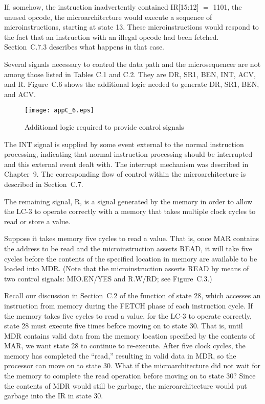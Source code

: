\documentclass{patt}
\begin{document}
If, somehow, the instruction inadvertently contained IR[15:12] $=$
1101, the unused opcode, the \nobreak microarchitecture would execute a
sequence of \nobreak microinstructions, starting at state 13.  These
microinstructions would respond to the fact that an instruction with
an illegal opcode had been fetched.  Section~C.7.3 describes what
happens in that case.

Several signals necessary to control the data path and the
microsequencer are not among those listed in Tables C.1 and C.2.  They
are DR, SR1, BEN, INT, ACV, and R.  Figure~C.6 shows the additional logic
needed to generate DR, SR1, BEN, and ACV.

\FloatBarrier
\begin{figure}[tb!]
\centerline{\texttt{[image: appC\_6.eps]}}
\caption{Additional logic required to provide control signals}
\label{fig:extralogic}
\end{figure}

The INT signal is supplied by some event external to the normal
instruction processing, indicating that normal instruction processing
should be interrupted and this external event dealt with.  The
interrupt mechanism was described in Chapter~9.  The corresponding
flow of control within the microarchitecture is described in
Section~C.7.

The remaining signal, R, is a signal generated by the memory in order
to allow the LC-3 to operate correctly with a memory that takes
multiple clock cycles to read or store a value.

Suppose it takes memory five cycles to read a value.  That is, once
MAR contains the address to be read and the microinstruction asserts
READ, it will take five cycles before the contents of the specified
location in memory are available to be loaded into MDR.  (Note that
the microinstruction asserts READ by means of two control signals:
MIO.EN/YES and R.W/RD; see Figure~C.3.)

Recall our discussion in Section~C.2 of the function of state 28,
which accesses an instruction from memory during the FETCH phase of
each instruction cycle.  If the memory takes five cycles to read a value,
for the LC-3 to operate correctly, state 28
must execute five times before moving on to state 30.  That is, until
MDR contains valid data from the memory location specified by the
contents of MAR, we want state 28 to continue to re-execute.  After
five clock cycles, the memory has completed the ``read,'' resulting in
valid data in MDR, so the processor can move on to state 30.  What if
the microarchitecture did not wait for the memory to complete the read
operation before moving on to state 30?  Since the contents of MDR
would still be garbage, the microarchitecture would put garbage into
the IR in state 30.
\end{document}
